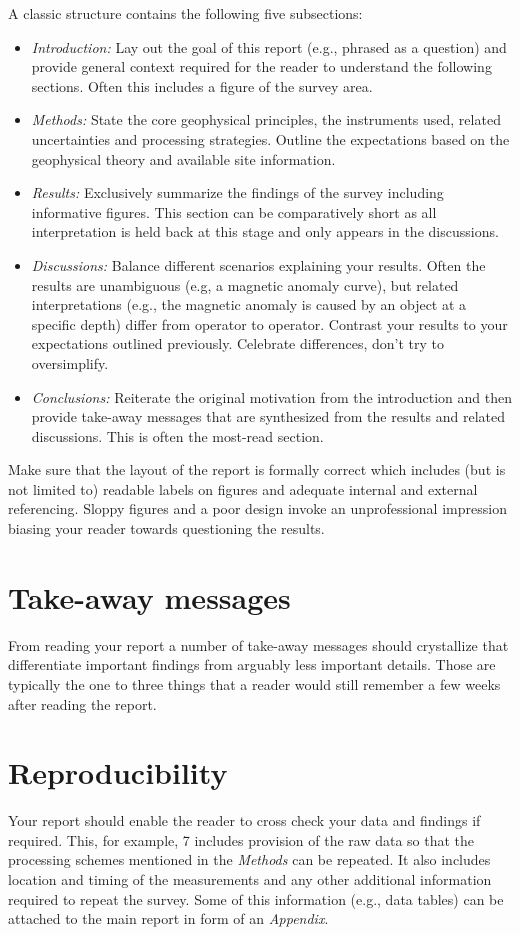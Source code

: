 \documentclass[letterpaper]{inzane_syllabus} %
\begin{document}
A classic structure contains the following five subsections: 
\begin{itemize} 
\setlength\itemsep{1.2em}
\item \textit{Introduction:} Lay out the goal of this report (e.g., phrased as a question) and provide general context required for the reader to understand the following sections. Often this includes a figure of the survey area.
\item \textit{Methods:} State the core geophysical principles, the instruments used, related uncertainties and processing strategies. Outline the expectations based on the geophysical theory and available site information.
\item \textit{Results:} Exclusively summarize the findings of the survey including informative figures. This section can be comparatively short as all interpretation is held back at this stage and only appears in the discussions.
\item \textit{Discussions:} Balance different scenarios explaining your results. Often the results are unambiguous (e.g, a magnetic anomaly curve), but related interpretations (e.g., the magnetic anomaly is caused by an object at a specific depth) differ from operator to operator. Contrast your results to your expectations outlined previously. Celebrate differences, don't try to oversimplify.
\item \textit{Conclusions:} Reiterate the original motivation from the introduction and then provide take-away messages that are synthesized from the results and related discussions. This is often the most-read section.
\end{itemize} 
Make sure that the layout of the report is formally correct which includes (but is not limited to) readable labels on figures and adequate internal and external referencing. Sloppy figures and a poor design invoke an unprofessional impression biasing your reader towards questioning the results.\\


\section{Take-away messages}

From reading your report a number of take-away messages should crystallize that differentiate important findings from arguably less important details. Those are typically the one to three things that a reader would still remember a few weeks after reading the report.\\


\section{Reproducibility}

Your report should enable the reader to cross check your data and findings if required. This, for example, 7 includes provision of the raw data so that the processing schemes mentioned in the \textit{Methods} can be repeated. It also includes location and timing of the measurements and any other additional information required to repeat the survey. Some of this information (e.g., data tables) can be attached to the main report in form of an \textit{Appendix}. 
\end{document}
